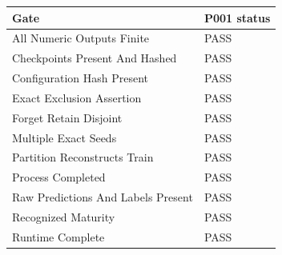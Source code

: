 \begin{tabular}{ll}
\toprule
Gate & P001 status \\
\midrule
All Numeric Outputs Finite & PASS \\
Checkpoints Present And Hashed & PASS \\
Configuration Hash Present & PASS \\
Exact Exclusion Assertion & PASS \\
Forget Retain Disjoint & PASS \\
Multiple Exact Seeds & PASS \\
Partition Reconstructs Train & PASS \\
Process Completed & PASS \\
Raw Predictions And Labels Present & PASS \\
Recognized Maturity & PASS \\
Runtime Complete & PASS \\
\bottomrule
\end{tabular}
